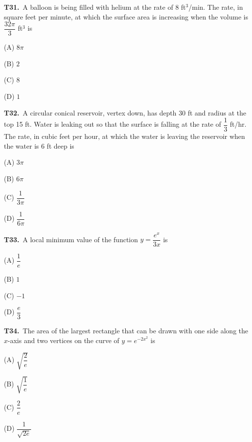\documentclass[11pt]{article}
\begin{document}
\bigskip\noindent\textbf{T31.}\ A balloon is being filled with helium at the rate of 8 ft$^3$/min. The rate, in square feet per minute, at which the surface area is increasing when the volume is $\dfrac{32\pi}{3}$ ft$^3$ is
\begin{list}{}{\setlength{\leftmargin}{3em}\setlength{\labelwidth}{2.5em}\setlength{\itemsep}{0pt}\setlength{\topsep}{2pt}}
\item[(A)] $8\pi$
\item[(B)] $2$
\item[(C)] $8$
\item[(D)] $1$
\end{list}

\bigskip\noindent\textbf{T32.}\ A circular conical reservoir, vertex down, has depth 30 ft and radius at the top 15 ft. Water is leaking out so that the surface is falling at the rate of $\dfrac{1}{3}$ ft/hr. The rate, in cubic feet per hour, at which the water is leaving the reservoir when the water is 6 ft deep is
\begin{list}{}{\setlength{\leftmargin}{3em}\setlength{\labelwidth}{2.5em}\setlength{\itemsep}{0pt}\setlength{\topsep}{2pt}}
\item[(A)] $3\pi$
\item[(B)] $6\pi$
\item[(C)] $\dfrac{1}{3\pi}$
\item[(D)] $\dfrac{1}{6\pi}$
\end{list}

\bigskip\noindent\textbf{T33.}\ A local minimum value of the function $y = \dfrac{e^x}{3x}$ is
\begin{list}{}{\setlength{\leftmargin}{3em}\setlength{\labelwidth}{2.5em}\setlength{\itemsep}{0pt}\setlength{\topsep}{2pt}}
\item[(A)] $\dfrac{1}{e}$
\item[(B)] $1$
\item[(C)] $-1$
\item[(D)] $\dfrac{e}{3}$
\end{list}

\bigskip\noindent\textbf{T34.}\ The area of the largest rectangle that can be drawn with one side along the $x$-axis and two vertices on the curve of $y = e^{-2x^2}$ is
\begin{list}{}{\setlength{\leftmargin}{3em}\setlength{\labelwidth}{2.5em}\setlength{\itemsep}{0pt}\setlength{\topsep}{2pt}}
\item[(A)] $\sqrt{\dfrac{2}{e}}$
\item[(B)] $\sqrt{\dfrac{1}{e}}$
\item[(C)] $\dfrac{2}{e}$
\item[(D)] $\dfrac{1}{\sqrt{2e}}$
\end{list}
\end{document}
